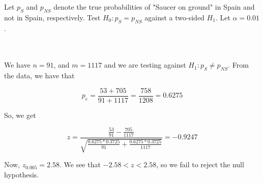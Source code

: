 Let $p_S$ and $p_{NS}$ denote the true probabilities of "Saucer on ground" in Spain and not in Spain,
respectively. Test $H_0:p_S=p_{NS}$ against a two-sided $H_1$. Let $\alpha=0.01$.\\\\

\begin{solution}\renewcommand{\qedsymbol}{}\ \\
    We have $n=91$, and $m=1117$ and we are testing against $H_1:p_S\neq p_{NS}$. From the data, we have
    that
    
    $$p_e=\frac{53+705}{91+1117}=\frac{758}{1208}=0.6275$$
    
    So, we get
    
    $$z=\frac{\frac{53}{91}-\frac{705}{1117}}{\sqrt{\frac{0.6275*0.3725}{91}+\frac{0.6275*0.3725}{1117}}}
    =-0.9247$$
    
    Now, $z_{0.005}=2.58$. We see that $-2.58<z<2.58$, so we fail to reject the null hypothesis.

\end{solution}